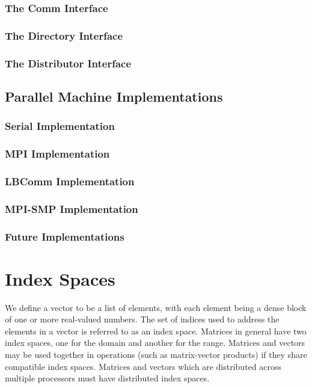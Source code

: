 \documentclass[12pt,relax]{PetraObjectModel}
\begin{document}
\subsubsection{The Comm Interface}
\subsubsection{The Directory Interface}
\subsubsection{The Distributor Interface}

\subsection{Parallel Machine Implementations}
\subsubsection{Serial Implementation}
\subsubsection{MPI Implementation}
\subsubsection{LBComm Implementation}
\subsubsection{MPI-SMP Implementation}
\subsubsection{Future Implementations}


\section{Index Spaces}
We define a vector to be a list of elements, with each element being a
dense block of one or more real-valued numbers. The set of indices used to
address the elements in a vector is referred to as an index space. Matrices
in general have two index spaces, one for the domain and another for the
range. Matrices and vectors may be used together in operations (such as
matrix-vector products) if they share compatible index spaces. Matrices
and vectors which are distributed across multiple processors must have
distributed index spaces.
\end{document}
